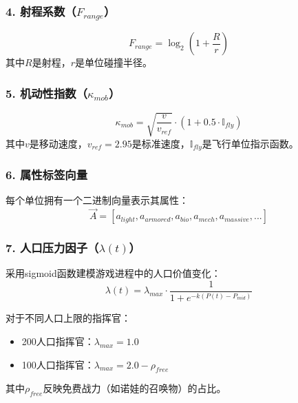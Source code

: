 \documentclass[a4paper,12pt]{article}
\begin{document}
\subsubsection{4. 射程系数（$F_{range}$）}
\begin{equation}
F_{range} = \log_2(1 + \frac{R}{r})
\end{equation}
其中$R$是射程，$r$是单位碰撞半径。

\subsubsection{5. 机动性指数（$\kappa_{mob}$）}
\begin{equation}
\kappa_{mob} = \sqrt{\frac{v}{v_{ref}}} \cdot (1 + 0.5 \cdot \mathbb{I}_{fly})
\end{equation}
其中$v$是移动速度，$v_{ref} = 2.95$是标准速度，$\mathbb{I}_{fly}$是飞行单位指示函数。

\subsubsection{6. 属性标签向量}
每个单位拥有一个二进制向量表示其属性：
\begin{equation}
\vec{A} = [a_{light}, a_{armored}, a_{bio}, a_{mech}, a_{massive}, ...]
\end{equation}

\subsubsection{7. 人口压力因子（$\lambda(t)$）}
采用sigmoid函数建模游戏进程中的人口价值变化：
\begin{equation}
\lambda(t) = \lambda_{max} \cdot \frac{1}{1 + e^{-k(P(t) - P_{mid})}}
\end{equation}

对于不同人口上限的指挥官：
\begin{itemize}
\item 200人口指挥官：$\lambda_{max} = 1.0$
\item 100人口指挥官：$\lambda_{max} = 2.0 - \rho_{free}$
\end{itemize}

其中$\rho_{free}$反映免费战力（如诺娃的召唤物）的占比。
\end{document}
